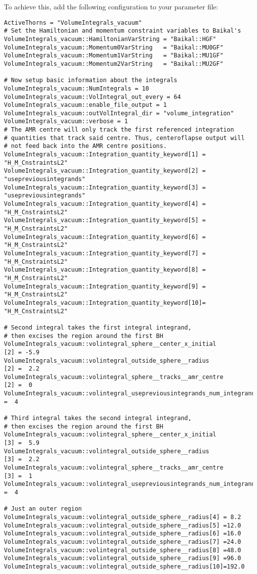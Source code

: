 To achieve this, add the following configuration to your parameter file:
\begin{verbatim}
ActiveThorns = "VolumeIntegrals_vacuum"
# Set the Hamiltonian and momentum constraint variables to Baikal's
VolumeIntegrals_vacuum::HamiltonianVarString = "Baikal::HGF"
VolumeIntegrals_vacuum::Momentum0VarString   = "Baikal::MU0GF"
VolumeIntegrals_vacuum::Momentum1VarString   = "Baikal::MU1GF"
VolumeIntegrals_vacuum::Momentum2VarString   = "Baikal::MU2GF"

# Now setup basic information about the integrals
VolumeIntegrals_vacuum::NumIntegrals = 10
VolumeIntegrals_vacuum::VolIntegral_out_every = 64
VolumeIntegrals_vacuum::enable_file_output = 1
VolumeIntegrals_vacuum::outVolIntegral_dir = "volume_integration"
VolumeIntegrals_vacuum::verbose = 1
# The AMR centre will only track the first referenced integration
# quantities that track said centre. Thus, centeroflapse output will
# not feed back into the AMR centre positions.
VolumeIntegrals_vacuum::Integration_quantity_keyword[1] = "H_M_CnstraintsL2"
VolumeIntegrals_vacuum::Integration_quantity_keyword[2] = "usepreviousintegrands"
VolumeIntegrals_vacuum::Integration_quantity_keyword[3] = "usepreviousintegrands"
VolumeIntegrals_vacuum::Integration_quantity_keyword[4] = "H_M_CnstraintsL2"
VolumeIntegrals_vacuum::Integration_quantity_keyword[5] = "H_M_CnstraintsL2"
VolumeIntegrals_vacuum::Integration_quantity_keyword[6] = "H_M_CnstraintsL2"
VolumeIntegrals_vacuum::Integration_quantity_keyword[7] = "H_M_CnstraintsL2"
VolumeIntegrals_vacuum::Integration_quantity_keyword[8] = "H_M_CnstraintsL2"
VolumeIntegrals_vacuum::Integration_quantity_keyword[9] = "H_M_CnstraintsL2"
VolumeIntegrals_vacuum::Integration_quantity_keyword[10]= "H_M_CnstraintsL2"

# Second integral takes the first integral integrand,
# then excises the region around the first BH
VolumeIntegrals_vacuum::volintegral_sphere__center_x_initial            [2] = -5.9
VolumeIntegrals_vacuum::volintegral_outside_sphere__radius              [2] =  2.2
VolumeIntegrals_vacuum::volintegral_sphere__tracks__amr_centre          [2] =  0
VolumeIntegrals_vacuum::volintegral_usepreviousintegrands_num_integrands[2] =  4

# Third integral takes the second integral integrand,
# then excises the region around the first BH
VolumeIntegrals_vacuum::volintegral_sphere__center_x_initial            [3] =  5.9
VolumeIntegrals_vacuum::volintegral_outside_sphere__radius              [3] =  2.2
VolumeIntegrals_vacuum::volintegral_sphere__tracks__amr_centre          [3] =  1
VolumeIntegrals_vacuum::volintegral_usepreviousintegrands_num_integrands[3] =  4

# Just an outer region
VolumeIntegrals_vacuum::volintegral_outside_sphere__radius[4] = 8.2
VolumeIntegrals_vacuum::volintegral_outside_sphere__radius[5] =12.0
VolumeIntegrals_vacuum::volintegral_outside_sphere__radius[6] =16.0
VolumeIntegrals_vacuum::volintegral_outside_sphere__radius[7] =24.0
VolumeIntegrals_vacuum::volintegral_outside_sphere__radius[8] =48.0
VolumeIntegrals_vacuum::volintegral_outside_sphere__radius[9] =96.0
VolumeIntegrals_vacuum::volintegral_outside_sphere__radius[10]=192.0
\end{verbatim}



